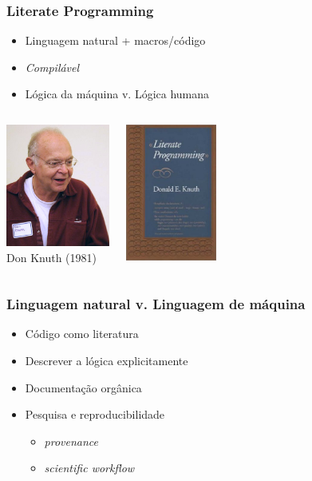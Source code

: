 \documentclass[10pt]{beamer}
\begin{document}
\begin{frame}
  \frametitle{Literate Programming}
  \begin{itemize}
  \item Linguagem natural + macros/código
  \item \emph{Compilável}
  \item Lógica da máquina v. Lógica humana
  \end{itemize}
  \begin{columns}
    \column{5cm}
    \begin{center}
      \includegraphics[width=3.4cm]{imagens/knuth.jpg}\\
      Don Knuth (1981)
    \end{center}
    \column{5cm}
    \begin{center}
      \includegraphics[width=3cm]{imagens/Literate_Programming_book_cover.jpg}
    \end{center}
  \end{columns}
\end{frame}

\begin{frame}
  \frametitle{Linguagem natural v. Linguagem de máquina}
  \begin{itemize}
  \item Código como literatura
  \item Descrever a lógica explicitamente
  \item Documentação orgânica
  \item \alert{Pesquisa e reproducibilidade} 
  \begin{itemize}
  	\item \emph{provenance}
    \item \emph{scientific workflow}
  \end{itemize}
  \end{itemize}
\end{frame}
\end{document}
